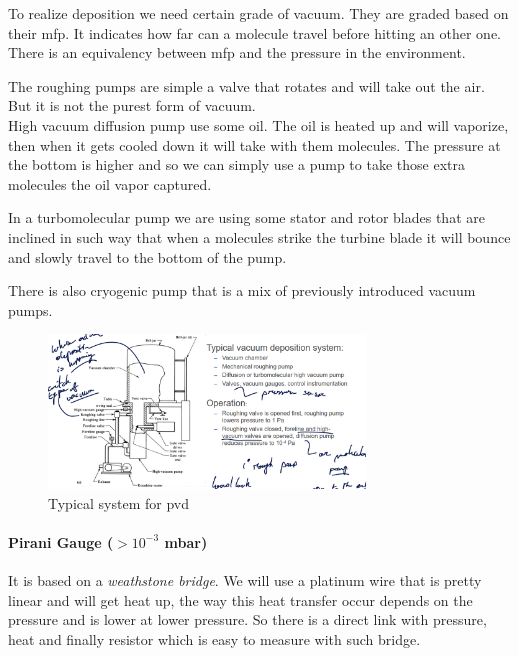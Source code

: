 \documentclass[
]{article}
\begin{document}
To realize deposition we need certain grade of vacuum. They are graded
based on their {mfp}. It indicates how far can a molecule travel before
hitting an other one. There is an equivalency between {mfp} and the
pressure in the environment.

The roughing pumps are simple a valve that rotates and will take out the
air. But it is not the purest form of vacuum.\\
High vacuum diffusion pump use some oil. The oil is heated up and will
vaporize, then when it gets cooled down it will take with them
molecules. The pressure at the bottom is higher and so we can simply use
a pump to take those extra molecules the oil vapor captured.

In a turbomolecular pump we are using some stator and rotor blades that
are inclined in such way that when a molecules strike the turbine blade
it will bounce and slowly travel to the bottom of the pump.

There is also cryogenic pump that is a mix of previously introduced
vacuum pumps.

\begin{figure}
\hypertarget{fig:PVD-label}{%
\centering
\includegraphics[width=0.75\textwidth,height=\textheight]{Vacuum_PVD.png}
\caption{Typical system for {pvd}}\label{fig:PVD-label}
}
\end{figure}

\hypertarget{pirani-gauge-10-3-mbar}{%
\paragraph{\texorpdfstring{Pirani Gauge (\(> 10^{-3}\)
mbar)}{Pirani Gauge (\textgreater{} 10\^{}\{-3\} mbar)}}\label{pirani-gauge-10-3-mbar}}

It is based on a \emph{weathstone bridge}. We will use a platinum wire
that is pretty linear and will get heat up, the way this heat transfer
occur depends on the pressure and is lower at lower pressure. So there
is a direct link with pressure, heat and finally resistor which is easy
to measure with such bridge.
\end{document}
